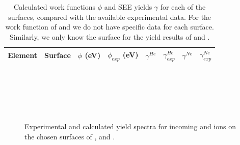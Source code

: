 \begin{refsection}
\begin{table}[ht] 
\centering 
\renewcommand{\arraystretch}{1.3} 
\caption{Calculated work functions $\phi$ and SEE yields $\gamma$ for each of 
the surfaces, compared with the available experimental data. For the work 
function of  and  we do not have specific data for each surface. 
Similarly, we only know the surface for the yield results of  and 
.} 
\label{quotas:tab-metal_results} 
\begin{tabular}{c @{\hskip 1em} | @{\hskip 1em} c @{\hskip 1em} | @{\hskip 
1em}  c @{\hskip 1em} c @{\hskip 1em} | @{\hskip 1em}  c @{\hskip 2em}  c 
@{\hskip 1em} | @{\hskip 1em} c @{\hskip 2em} c} 
 Element & Surface & $\phi$ (\si{\electronvolt}) & $\phi_{exp}$ 
(\si{\electronvolt}) & $\gamma^{He}$ & $\gamma^{He}_{exp}$ & $\gamma^{Ne}$ & 
$\gamma^{Ne}_{exp}$ \\\hline 
 
\hline 
\end{tabular} 
\end{table} \clearpage
 
\begin{figure}[!ht] 
    \centering 
    \begin{subfigure}[t]{0.49\textwidth} 
        \centering 
         
    \end{subfigure}%
    ~  
    \begin{subfigure}[t]{0.49\textwidth} 
        \centering 
         
    \end{subfigure} 
    \begin{subfigure}[t]{0.49\textwidth} 
        \centering 
         
    \end{subfigure}%
    ~  
    \begin{subfigure}[t]{0.49\textwidth} 
        \centering 
         
    \end{subfigure} 
    \begin{subfigure}[t]{0.49\textwidth} 
        \centering 
         
    \end{subfigure}%
    ~  
    \begin{subfigure}[t]{0.49\textwidth} 
        \centering 
         
    \end{subfigure} 
    \caption{\label{quotas:fig-metals_results1} Experimental and calculated 
yield spectra for incoming  and  ions on the chosen surfaces of ,  and .} 
\end{figure} \clearpage 


\end{refsection}
